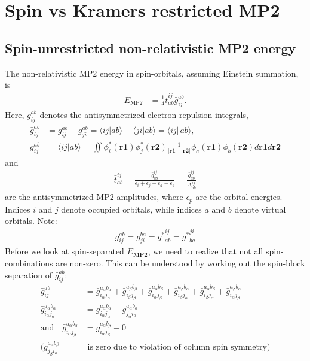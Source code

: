 \documentclass[11pt,oneside]{book}
\begin{document}
\frontmatter
\tableofcontents

\mainmatter

\chapter{Spin vs Kramers restricted MP2}
\label{ch:SR-vs-KR}

\section{Spin-unrestricted non-relativistic MP2 energy}

The non-relativistic MP2 energy in spin-orbitals, assuming Einstein summation, is
\begin{align}
    E_{\text{MP2}} &= \frac{1}{4} \bar{t}_{ab}^{ij} \bar{g}_{ij}^{ab} .
\end{align}
Here, $\bar{g}_{ij}^{ab}$ denotes the antisymmetrized electron repulsion integrals,
\begin{align}
    \bar{g}_{ij}^{ab} 
    &= g_{ij}^{ab} - g_{ji}^{ab} = \langle ij | ab \rangle - \langle ji | ab \rangle = \langle ij \Vert ab \rangle,\\
    g_{ij}^{ab} &=  \langle ij | ab \rangle = \iint \phi_i^*(\mathbf{r1}) \phi_j^*(\mathbf{r2}) \frac{1}{|\mathbf{r1} - \mathbf{r2}|} \phi_a(\mathbf{r1}) \phi_b(\mathbf{r2}) d\mathbf{r1} d\mathbf{r2}
\end{align}
and
\begin{align}
    \bar{t}_{ab}^{ij} = \frac{\bar{g}_{ab}^{ij}}{\epsilon_i + \epsilon_j - \epsilon_a - \epsilon_b} = \frac{\bar{g}_{ab}^{ij}}{\Delta_{ab}^{ij}}
\end{align}
are the antisymmetrized MP2 amplitudes, where $\epsilon_p$ are the orbital energies. Indices $i$ and $j$ denote occupied orbitals, while indices $a$ and $b$ denote virtual orbitals.
Note:
\begin{align}
    {g}_{ij}^{ab} =  {g}_{ji}^{ba} = {g^*}_{ab}^{ij} =   {g^*}_{ba}^{ji}
\end{align}
Before we look at spin-separated $E_{\textbf{MP2}}$, we need to realize that not all spin-combinations are non-zero. This can be understood by working out the spin-block separation of $\bar{g}_{ij}^{ab}$:
\begin{align}
    \bar{g}_{ij}^{ab} &= \bar{g}_{i_\alpha j_\alpha}^{a_\alpha b_\alpha} + \bar{g}_{i_\beta j_\beta}^{a_\beta b_\beta} + \bar{g}_{i_\alpha j_\beta}^{a_\alpha b_\beta}  + \bar{g}_{i_\beta j_\alpha}^{a_\beta b_\alpha} + \bar{g}_{i_\beta j_\alpha}^{a_\alpha b_\beta} + \bar{g}_{i_\alpha j_\beta}^{a_\beta b_\alpha} \nonumber \\
    \bar{g}_{i_\alpha j_\alpha}^{a_\alpha b_\alpha} &= g_{i_\alpha j_\alpha}^{a_\alpha b_\alpha} - g_{j_\alpha i_\alpha}^{a_\alpha b_\alpha} \quad \\
    \mathrm{ and } \quad 
    \bar{g}_{i_\alpha j_\beta}^{a_\alpha b_\beta} &=  g_{i_\alpha j_\beta}^{a_\alpha b_\beta} - 0 \quad \\ 
    (g_{j_\beta i_\alpha }^{a_\alpha b_\beta} & \text{ is zero due to violation of column spin symmetry})
\end{align}
\end{document}

